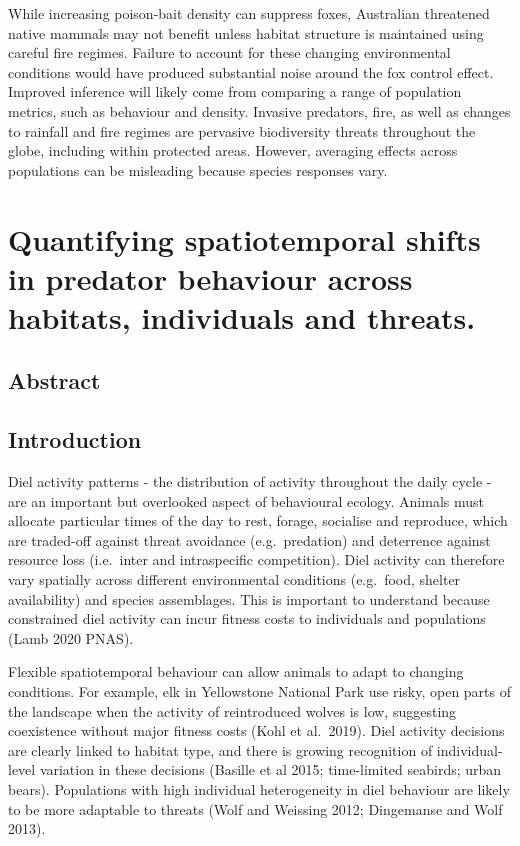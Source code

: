 \documentclass[11pt,a4paper,titlepage,twoside,openright]{style/unimelbthesis}
\begin{document}
\begin{mainmatter}
While increasing poison-bait density can suppress foxes, Australian threatened native mammals may not benefit unless habitat structure is maintained using careful fire regimes. Failure to account for these changing environmental conditions would have produced substantial noise around the fox control effect. Improved inference will likely come from comparing a range of population metrics, such as behaviour and density.
Invasive predators, fire, as well as changes to rainfall and fire regimes are pervasive biodiversity threats throughout the globe, including within protected areas. However, averaging effects across populations can be misleading because species responses vary.

\hypertarget{diel}{%
\chapter{Quantifying spatiotemporal shifts in predator behaviour across habitats, individuals and threats.}\label{diel}}

\hypertarget{abstract-1}{%
\section*{Abstract}\label{abstract-1}}

\newpage

\hypertarget{introduction-2}{%
\section{Introduction}\label{introduction-2}}

Diel activity patterns - the distribution of activity throughout the daily cycle - are an important but overlooked aspect of behavioural ecology. Animals must allocate particular times of the day to rest, forage, socialise and reproduce, which are traded-off against threat avoidance (e.g.~predation) and deterrence against resource loss (i.e.~inter and intraspecific competition). Diel activity can therefore vary spatially across different environmental conditions (e.g.~food, shelter availability) and species assemblages. This is important to understand because constrained diel activity can incur fitness costs to individuals and populations (Lamb 2020 PNAS).

Flexible spatiotemporal behaviour can allow animals to adapt to changing conditions. For example, elk in Yellowstone National Park use risky, open parts of the landscape when the activity of reintroduced wolves is low, suggesting coexistence without major fitness costs (Kohl et al.~2019). Diel activity decisions are clearly linked to habitat type, and there is growing recognition of individual-level variation in these decisions (Basille et al 2015; time-limited seabirds; urban bears). Populations with high individual heterogeneity in diel behaviour are likely to be more adaptable to threats (Wolf and Weissing 2012; Dingemanse and Wolf 2013).


\end{mainmatter}
\end{document}
